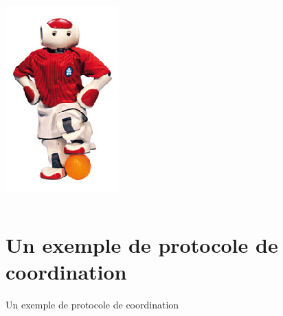 \documentclass{beamer}
\begin{document}
\begin{frame}
\begin{columns}
\begin{column}{0.25\textwidth}
\begin{center}
                \includegraphics[width=.95\linewidth]{images/nao1}
        \end{center}
    \end{column}
\end{columns}
\end{frame}


\section{Un exemple de protocole de coordination}
\begin{frame}
\begin{center}
{\LARGE Un exemple de protocole de coordination}
\end{center}
\end{frame}
\end{document}
